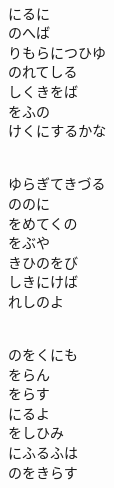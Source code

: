 \documentclass[10pt,b5j]{tarticle} %
\begin{document}
\begin{enumerate}
\begin{minipage}[c]{\blocksize}
        \vspace{\linespace}
        \item~\\
        にるに\\
        のへば\\
        りもらにつひゆ\\
        のれてしる\\
        しくきをば\\
        をふの\\
        けくにするかな
        
    \end{minipage}
    \begin{minipage}[c]{\blocksize}
        
        \vspace{\linespace}
        \item~\\
        ゆらぎてきづる\\
        ののに\\
        をめてくの\\
        をぶや\\
        きひのをび\\
        しきにけば\\
        れしのよ
        
    \end{minipage}
    \begin{minipage}[c]{\blocksize}
        
        \vspace{\linespace}
        \item~\\
        のをくにも\\
        をらん\\
        をらす\\
        にるよ\\
        をしひみ\\
        にふるふは\\
        のをきらす
        

\end{minipage}
\end{enumerate}
\end{document}

